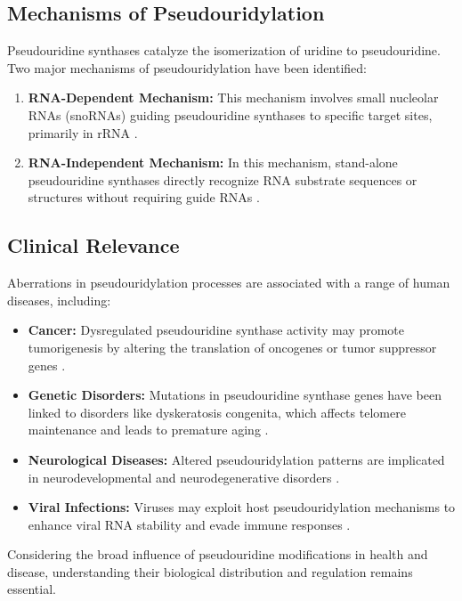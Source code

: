   \subsection{Mechanisms of Pseudouridylation}

    Pseudouridine synthases catalyze the isomerization of uridine to pseudouridine. Two major mechanisms of pseudouridylation have been identified:

    \begin{enumerate}
      \item \textbf{RNA-Dependent Mechanism:} This mechanism involves small nucleolar RNAs (snoRNAs) guiding pseudouridine synthases to specific target sites, primarily in rRNA \cite{tollervey1999small}.
      \item \textbf{RNA-Independent Mechanism:} In this mechanism, stand-alone pseudouridine synthases directly recognize RNA substrate sequences or structures without requiring guide RNAs \cite{ofengand2002pseudouridine}.
    \end{enumerate}

  \subsection{Clinical Relevance}

    Aberrations in pseudouridylation processes are associated with a range of human diseases, including:

    \begin{itemize}
      \item \textbf{Cancer:} Dysregulated pseudouridine synthase activity may promote tumorigenesis by altering the translation of oncogenes or tumor suppressor genes \cite{ramamurthy2020role}.
      \item \textbf{Genetic Disorders:} Mutations in pseudouridine synthase genes have been linked to disorders like dyskeratosis congenita, which affects telomere maintenance and leads to premature aging \cite{mason2008dyskeratosis}.
      \item \textbf{Neurological Diseases:} Altered pseudouridylation patterns are implicated in neurodevelopmental and neurodegenerative disorders \cite{havelund2017pseudouridine}.
      \item \textbf{Viral Infections:} Viruses may exploit host pseudouridylation mechanisms to enhance viral RNA stability and evade immune responses \cite{karijolich2015viral}.
    \end{itemize}

    Considering the broad influence of pseudouridine modifications in health and disease, understanding their biological distribution and regulation remains essential.


